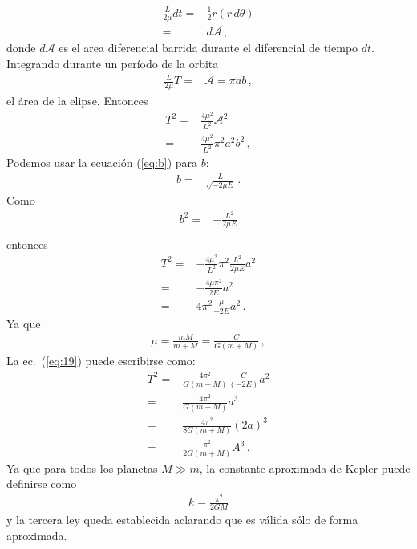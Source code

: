 \begin{align}
  \frac{L}{2\mu}dt =&\frac{1}{2}r (r\,d\theta)\nonumber\\
=&d\mathcal{A}\,,
\end{align}
donde $d\mathcal{A}$ es el area diferencial barrida durante el diferencial de tiempo $dt$. Integrando durante un período de la orbita
\begin{align}
  \frac{L}{2\mu} T=&\mathcal{A}=\pi a b\,,
\end{align}
el área de la elipse. Entonces
\begin{align}
  T^2=&\frac{4\mu^2}{L^2}\mathcal{A}^2\nonumber\\
  =&\frac{4\mu^2}{L^2}\pi^2 a^2 b^2\,,
\end{align}
Podemos usar la  ecuación (\ref{eq:b}) para $b$:
\begin{align*}
  b=&\frac{L}{\sqrt{-2\mu E}}\,.
\end{align*}
Como
\begin{align}
  b^2=&-\frac{L^2}{2\mu E}\nonumber\\
\end{align}
entonces
\begin{align}
  \label{eq:19}
T^2=&-\frac{4\mu^2}{L^2}\pi^2\frac{L^2}{2\mu E} a^2 \nonumber\\
=&-\frac{4\mu\pi^2}{2E} a^2 \nonumber\\
=&4\pi^2\frac{\mu}{-2E} a^2 \,.
\end{align}
Ya que
\begin{align}
  \mu=\frac{mM}{m+M}=\frac{C}{G(m+M)}\,,
\end{align}
La ec.~(\ref{eq:19}) puede escribirse como:
\begin{align}
  T^2=&\frac{4\pi^2}{G(m+M)}\frac{C}{(-2E)} a^2 \nonumber\\
=&\frac{4\pi^2}{G(m+M)}a^3 \nonumber\\
=&\frac{4\pi^2}{8G(m+M)}(2a)^3 \nonumber\\
=&\frac{\pi^2}{2G(m+M)}A^3 \,.
\end{align}
Ya que para todos los planetas $M\gg m$, la constante aproximada de Kepler puede definirse como
\begin{align}
  k=\frac{\pi^2}{2GM}
\end{align}
y la tercera ley queda establecida aclarando que es válida sólo de forma aproximada.


